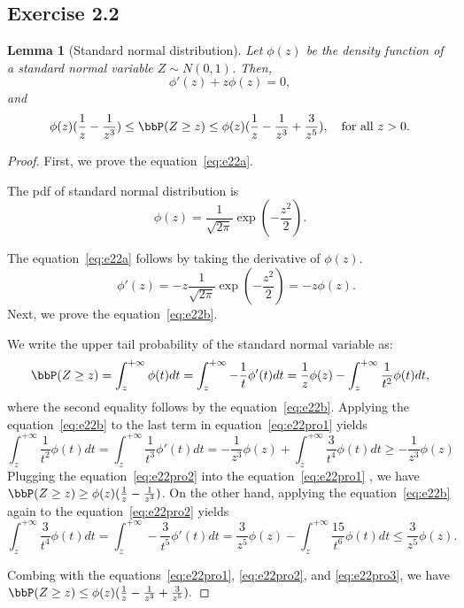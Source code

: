 \documentclass[11pt]{article}
\theoremstyle{plain}
\newtheorem{lem}{Lemma}
\theoremstyle{definition}
\begin{document}
\subsection{Exercise 2.2}
\begin{lem}[Standard normal distribution]\label{lem:n01}
	Let $\phi(z)$ be the density function of a standard normal variable $Z \sim N(0,1)$. Then, 
	\begin{equation}\label{eq:e22a}
		\phi'(z) + z \phi(z) = 0,
	\end{equation}
	and \begin{equation}\label{eq:e22b}
		\phi(z)(\frac{1}{z} - \frac{1}{z^3} ) \leq \bbP(Z \geq z) \leq \phi(z)(\frac{1}{z} - \frac{1}{z^3}+ \frac{3}{z^5} ), \quad \text{for all }z>0.
	\end{equation}
\end{lem}
\begin{proof}First, we prove the equation~\eqref{eq:e22a}. 

The pdf of standard normal distribution is
\[  \phi(z) = \frac{1}{\sqrt{2\pi}} \exp(-\frac{z^2}{2}  ).\]

The equation~\eqref{eq:e22a} follows by taking the derivative of $\phi(z)$.
\[\quad \phi'(z) = -z \frac{1}{\sqrt{2\pi}} \exp(-\frac{z^2}{2} ) = -z \phi(z). \] 
	Next, we prove the equation~\eqref{eq:e22b}. 
	
	We write the upper tail probability of the standard normal variable as:
	\begin{equation}\label{eq:e22pro1}
		\bbP(Z \geq z) = \int_{z}^{+\infty} \phi(t) dt = \int_{z}^{+\infty} - \frac{1}{t} \phi'(t) dt = \frac{1}{z} \phi(z) - \int_{z}^{+\infty} \frac{1}{t^2} \phi(t) dt,  
	\end{equation}
	where the second equality follows by the equation~\eqref{eq:e22b}. Applying the equation~\eqref{eq:e22b} to the last term in equation~\eqref{eq:e22pro1} yields
	\begin{equation}\label{eq:e22pro2}
	\int_{z}^{+\infty} \frac{1}{t^2} \phi(t) dt = \int_{z}^{+\infty} \frac{1}{t^3} \phi'(t) dt = - \frac{1}{z^3} \phi(z) + \int_{z}^{+\infty} \frac{3}{t^4} \phi(t) dt \geq  - \frac{1}{z^3} \phi(z)
	\end{equation}
	Plugging the equation~\eqref{eq:e22pro2} into the equation~\eqref{eq:e22pro1} , we have $\bbP(Z \geq z) \geq \phi(z)(\frac{1}{z}  - \frac{1}{z^3} )$. On the other hand, applying the equation~\eqref{eq:e22b} again to the equation~\eqref{eq:e22pro2} yields
	\begin{equation}\label{eq:e22pro3}
		\int_{z}^{+\infty} \frac{3}{t^4} \phi(t) dt = \int_{z}^{+\infty} - \frac{3}{t^5} \phi'(t) dt =\frac{3}{ z^5} \phi(z) -  \int_{z}^{+\infty} \frac{15}{t^6} \phi(t) dt \leq \frac{3}{ z^5} \phi(z).
	\end{equation}
	
	Combing with the equations~\eqref{eq:e22pro1}, \eqref{eq:e22pro2}, and  \eqref{eq:e22pro3}, we have $\bbP(Z \geq z) \leq \phi(z)(\frac{1}{z}  - \frac{1}{z^3} + \frac{3}{z^5} ).$
\end{proof}
\end{document}
